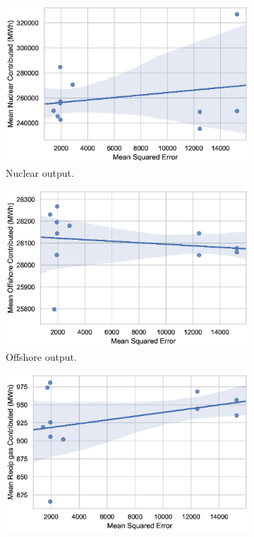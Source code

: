 \documentclass[final,3p,times,twocolumn,numbers]{elsarticle}
\begin{document}
\begin{figure}[h!]
\begin{subfigure}[b]{0.3\textwidth}
\includegraphics[width=\columnwidth]{figures/results/elecsim_results/results_2/contributed_Nuclear_mean_output.eps}
\caption{Nuclear output.}
\label{fig:contributed_Nuclear_mean_output}
\end{subfigure}
\medskip
\begin{subfigure}[b]{0.3\textwidth}   
\includegraphics[width=\columnwidth]{figures/results/elecsim_results/results_2/contributed_Offshore_mean_output.eps}
\caption{Offshore output.}
\label{fig:contributed_Offshore_mean_output.eps}
\end{subfigure}
\hfil
\begin{subfigure}[b]{0.3\textwidth}   
\includegraphics[width=1\columnwidth]{figures/results/elecsim_results/results_2/contributed_Recip_gas_mean_output.eps}

\end{subfigure}
\end{figure}
\end{document}
